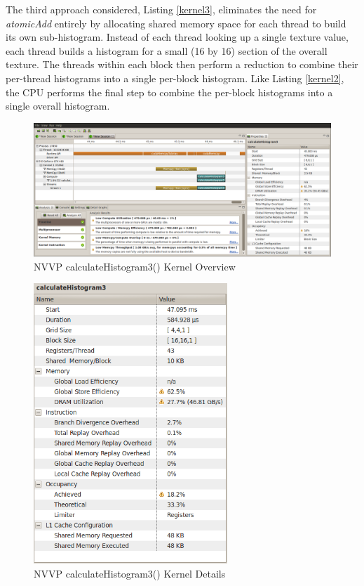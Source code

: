 \documentclass{article}
\begin{document}
The third approach considered, Listing \ref{kernel3}, eliminates the need for \emph{atomicAdd} entirely by allocating shared memory space for each thread to build its own sub-histogram. Instead of each thread looking up a single texture value, each thread builds a histogram for a small (16 by 16) section of the overall texture. The threads within each block then perform a reduction to combine their per-thread histograms into a single per-block histogram\cite{tree-reduction}. Like Listing \ref{kernel2}, the CPU performs the final step to combine the per-block histograms into a single overall histogram.

\begin{figure}
\centering
\includegraphics[width=1.0\textwidth]{screenshots/nvvp/calculateHistogram3_screen3.png}
\caption{NVVP calculateHistogram3() Kernel Overview}
\label{kernel3nvvp3}
\end{figure}

\begin{figure}
\centering
\includegraphics[width=0.65\textwidth]{screenshots/nvvp/calculateHistogram3_screen4.png}
\caption{NVVP calculateHistogram3() Kernel Details}
\label{kernel3nvvp4}
\end{figure}
\end{document}
